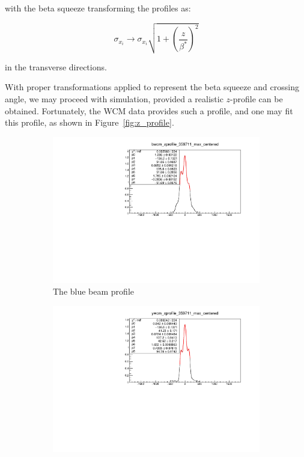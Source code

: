{\noindent} with the beta squeeze transforming the profiles as:

\begin{equation}
\label{eq:beta_star_transform}
\sigma_{x_i} \rightarrow \sigma_{x_i} \sqrt{1+\left(\frac{z}{\beta^*}\right)^2 }
\end{equation}

{\noindent} in the transverse directions.

With proper transformations applied to represent the beta squeeze and crossing
angle, we may proceed with simulation, provided a realistic $z$-profile can be
obtained. Fortunately, the WCM data provides such a profile, and one may fit
this profile, as shown in Figure~\ref{fig:z_profile}.

\begin{figure}
  \centering
  \begin{subfigure}[b]{0.8\textwidth}
    \centering
    \includegraphics[width=\linewidth]{./figures/blue_zprofile_359711.pdf}
    \caption{The blue beam profile}
  \end{subfigure}
  \begin{subfigure}[b]{0.8\textwidth}
    \centering
    \includegraphics[width=\linewidth]{./figures/yell_zprofile_359711.pdf}

\end{subfigure}
\end{figure}
